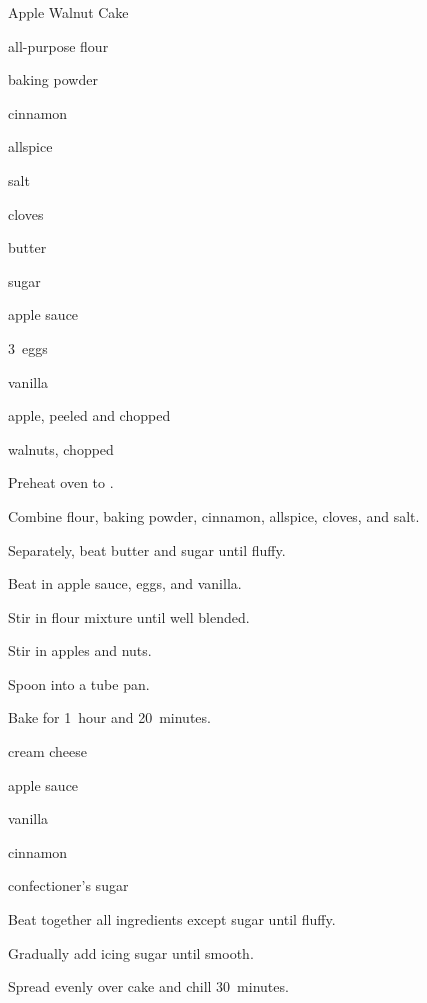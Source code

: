 \begin{recipe}{Apple Walnut Cake}{}{}

\begin{ingredients}
\item {} all-purpose flour
\item \tp{2\half} baking powder
\item \tp{1\half} cinnamon
\item \tp{\half} allspice
\item \tp{\half} salt
\item \tp{\quarter} cloves
\item \C{\threequarter} butter
\item \C{1\half} sugar
\item \C{1\half} apple sauce
\item 3~eggs
\item {} vanilla
\item {} apple, peeled and chopped
\item \C{\twothird} walnuts, chopped
\end{ingredients}

\begin{directions}
\item Preheat oven to .
\item Combine flour, baking powder, cinnamon, allspice, cloves, and salt.
\item Separately, beat butter and sugar until fluffy.
\item Beat in apple sauce, eggs, and vanilla.
\item Stir in flour mixture until well blended.
\item Stir in apples and nuts.
\item Spoon into a  tube pan.
\item Bake for 1~hour and 20~minutes.
\end{directions}

\begin{ingredients}
\item {} cream cheese
\item {} apple sauce
\item {} vanilla
\item \tp{\quarter} cinnamon
\item \C{4\half} confectioner's sugar
\end{ingredients}

\begin{directions}
\item Beat together all ingredients except sugar until fluffy.
\item Gradually add icing sugar until smooth.
\item Spread evenly over cake and chill 30~minutes.
\end{directions}

\end{recipe}
